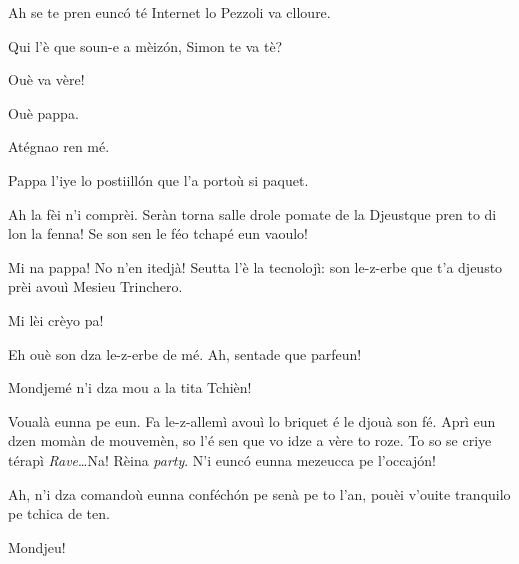 \begin{drama}
\Mariettospeaks Ah se te pren eunc\'o té Internet lo Pezzoli va clloure.


\Cienspeaks Qui l'è que soun-e a mèiz\'on, Simon te va tè?

\Mariettospeaks Ouè va vère!

\Simonspeaks Ouè pappa. 

\Cienspeaks Atégnao ren mé.


\Simonspeaks Pappa l’iye lo postiill\'on que l’a portoù si paquet.

\Cienspeaks Ah la fèi n'i comprèi. Seràn torna salle drole pomate de la \og Djeust\fg que pren to di lon la fenna! Se son sen le féo tchapé eun vaoulo!

\Simonspeaks Mi na pappa! No n'en itedjà! Seutta l'è la tecnolojì: son le-z-erbe que t’a djeusto prèi avouì Mesieu Trinchero.

\Cienspeaks Mi lèi crèyo pa!


\Trincherospeaks Eh ouè son dza le-z-erbe de mé. Ah, sentade que parfeun!


\Mariettospeaks Mondjemé n’i dza mou a la tita Tchièn!


\Trincherospeaks Voualà eunna pe eun. Fa le-z-allemì avouì lo briquet é le djouà son fé. Aprì eun dzen momàn de mouvemèn, so l’é sen que vo idze a vère to roze. To so se criye térapì \textit{Rave}\ldots Na! Rèina \textit{party}. N’i eunc\'o eunna mezeucca pe l’occaj\'on!



\Trincherospeaks Ah, n’i dza comandoù eunna conféch\'on pe senà pe to l’an, pouèi v'ouite tranquilo pe tchica de ten. 

\Cienspeaks Mondjeu!


\end{drama}
